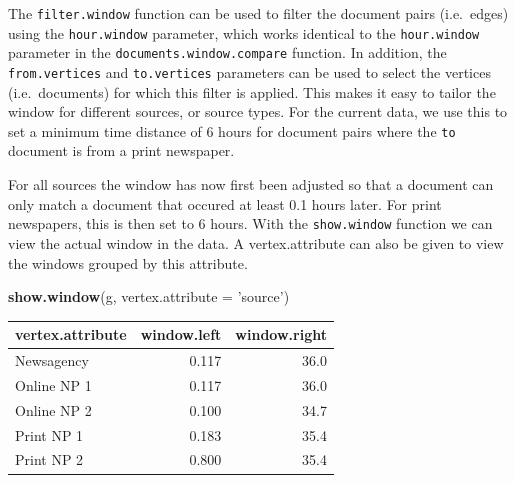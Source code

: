 \documentclass[]{article}
\newenvironment{Shaded}{\begin{snugshade}}{\end{snugshade}}
\newcommand{\KeywordTok}[1]{\textcolor[rgb]{0.13,0.29,0.53}{\textbf{{#1}}}}
\newcommand{\DataTypeTok}[1]{\textcolor[rgb]{0.13,0.29,0.53}{{#1}}}
\newcommand{\DecValTok}[1]{\textcolor[rgb]{0.00,0.00,0.81}{{#1}}}
\newcommand{\FloatTok}[1]{\textcolor[rgb]{0.00,0.00,0.81}{{#1}}}
\newcommand{\StringTok}[1]{\textcolor[rgb]{0.31,0.60,0.02}{{#1}}}
\newcommand{\CommentTok}[1]{\textcolor[rgb]{0.56,0.35,0.01}{\textit{{#1}}}}
\newcommand{\NormalTok}[1]{{#1}}
\begin{document}
The \texttt{filter.window} function can be used to filter the document
pairs (i.e.~edges) using the \texttt{hour.window} parameter, which works
identical to the \texttt{hour.window} parameter in the
\texttt{documents.window.compare} function. In addition, the
\texttt{from.vertices} and \texttt{to.vertices} parameters can be used
to select the vertices (i.e.~documents) for which this filter is
applied. This makes it easy to tailor the window for different sources,
or source types. For the current data, we use this to set a minimum time
distance of 6 hours for document pairs where the \texttt{to} document is
from a print newspaper.

\begin{Shaded}
\end{Shaded}

For all sources the window has now first been adjusted so that a
document can only match a document that occured at least 0.1 hours
later. For print newspapers, this is then set to 6 hours. With the
\texttt{show.window} function we can view the actual window in the data.
A vertex.attribute can also be given to view the windows grouped by this
attribute.

\begin{Shaded}
\begin{Highlighting}[]
\KeywordTok{show.window}\NormalTok{(g, }\DataTypeTok{vertex.attribute =} \StringTok{'source'}\NormalTok{)}
\end{Highlighting}
\end{Shaded}

\begin{longtable}[c]{@{}lrr@{}}
\toprule
vertex.attribute & window.left & window.right\tabularnewline
\midrule
\endhead
Newsagency & 0.117 & 36.0\tabularnewline
Online NP 1 & 0.117 & 36.0\tabularnewline
Online NP 2 & 0.100 & 34.7\tabularnewline
Print NP 1 & 0.183 & 35.4\tabularnewline
Print NP 2 & 0.800 & 35.4\tabularnewline
\bottomrule
\end{longtable}
\end{document}
